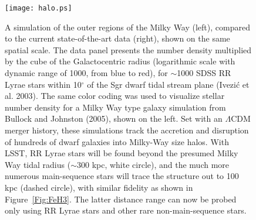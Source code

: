 \documentclass{emulateapj}
\begin{document}
\begin{figure}
\texttt{[image: halo.ps]}
\caption{A simulation of the outer regions of the Milky Way (left), compared to the 
current state-of-the-art data (right), shown on the same spatial scale. The data panel 
presents the number density multiplied by the cube of the Galactocentric
radius (logarithmic scale with dynamic range of 1000, from blue to red), for $\sim$1000 
SDSS RR Lyrae stars within 10$^\circ$ of the Sgr dwarf tidal stream plane (Ivezi\'{c} et 
al. 2003). The same color coding was used to visualize stellar number density for a Milky 
Way type galaxy simulation from Bullock and Johnston (2005), shown on the left. Set with 
an $\Lambda$CDM merger history, these simulations track the accretion and 
disruption of hundreds of dwarf galaxies into Milky-Way size halos. With LSST, RR Lyrae 
stars will be found beyond the presumed Milky Way tidal radius ($\sim$300 kpc, white circle), 
and the much more numerous main-sequence stars will trace the structure out to 100 kpc 
(dashed circle), with similar fidelity as shown in Figure~\ref{Fig:FeH3}. The latter 
distance range can now be probed only using RR Lyrae stars and other rare 
non-main-sequence stars.} 
\label{Fig:halo}
\end{figure}
 
\end{document}
